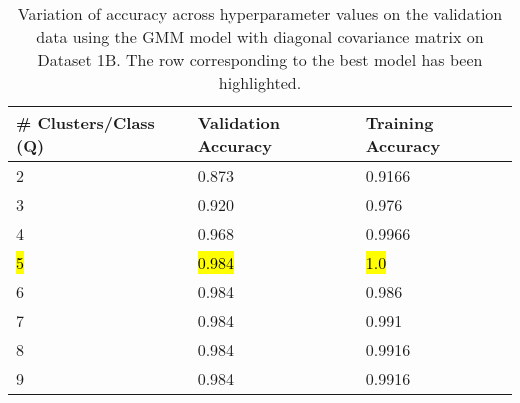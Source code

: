 \begin{table}[H]
\centering
\begin{tabular}{l l l }
\hline
\hline
\textbf{\# Clusters/Class (Q)} &  \textbf{Validation Accuracy} &  \textbf{Training Accuracy}  \\
\hline
\hline
2 & 0.873 & 0.9166\\
3 & 0.920 & 0.976\\
4 & 0.968 & 0.9966\\
\hl{5} & \hl{0.984} & \hl{1.0}\\
6 & 0.984 & 0.986\\
7 & 0.984 & 0.991\\
8 & 0.984 & 0.9916\\
9 & 0.984 & 0.9916\\
\hline
\end{tabular}
\caption{Variation of accuracy across hyperparameter values on the validation data using the GMM model with diagonal covariance matrix on Dataset 1B. The row corresponding to the best model has been highlighted.}
\label{tab:cv1b}
\end{table}


